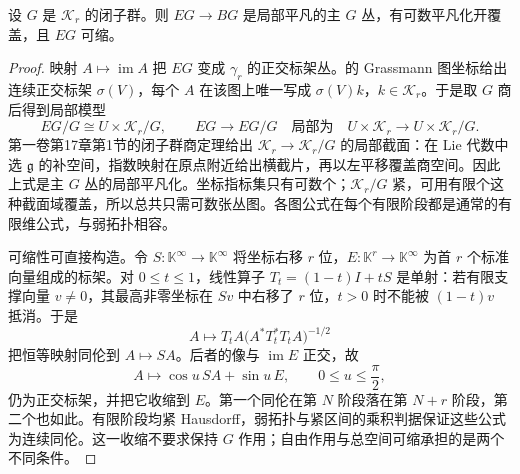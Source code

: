\begin{proposition}\label{g2:prop:universal-matrix-principal-bundle}
	设 \(G\) 是 \(\mathcal K_r\) 的闭子群。则 \(EG\to BG\) 是局部平凡的主 \(G\) 丛，有可数平凡化开覆盖，且 \(EG\) 可缩。
\end{proposition}
\begin{proof}
	映射 \(A\mapsto\operatorname{im}A\) 把 \(EG\) 变成 \(\gamma_r\) 的正交标架丛。的 Grassmann 图坐标给出连续正交标架 \(\sigma(V)\)，每个 \(A\) 在该图上唯一写成 \(\sigma(V)k\)，\(k\in \mathcal K_r\)。于是取 \(G\) 商后得到局部模型
	\[
		EG/G\cong U\times \mathcal K_r/G,\qquad
		EG\longrightarrow EG/G\quad\text{局部为}\quad
		U\times \mathcal K_r\longrightarrow U\times \mathcal K_r/G.
	\]
	第一卷第17章第1节的闭子群商定理给出 \(\mathcal K_r\to \mathcal K_r/G\) 的局部截面：在 Lie 代数中选 \(\mathfrak g\) 的补空间，指数映射在原点附近给出横截片，再以左平移覆盖商空间。因此上式是主 \(G\) 丛的局部平凡化。坐标指标集只有可数个；\(\mathcal K_r/G\) 紧，可用有限个这种截面域覆盖，所以总共只需可数张丛图。各图公式在每个有限阶段都是通常的有限维公式，与弱拓扑相容。

	可缩性可直接构造。令 \(S:\mathbb K^\infty\to \mathbb K^\infty\) 将坐标右移 \(r\) 位，\(E:\mathbb K^r\to \mathbb K^\infty\) 为首 \(r\) 个标准向量组成的标架。对 \(0\le t\le1\)，线性算子 \(T_t=(1-t)I+tS\) 是单射：若有限支撑向量 \(v\ne0\)，其最高非零坐标在 \(Sv\) 中右移了 \(r\) 位，\(t>0\) 时不能被 \((1-t)v\) 抵消。于是
	\[
		A\longmapsto T_tA\bigl(A^*T_t^*T_tA\bigr)^{-1/2}
	\]
	把恒等映射同伦到 \(A\mapsto SA\)。后者的像与 \(\operatorname{im}E\) 正交，故
	\[
		A\longmapsto\cos u\,SA+\sin u\,E,
		\qquad 0\le u\le\frac\pi2,
	\]
	仍为正交标架，并把它收缩到 \(E\)。第一个同伦在第 \(N\) 阶段落在第 \(N+r\) 阶段，第二个也如此。有限阶段均紧 Hausdorff，弱拓扑与紧区间的乘积判据保证这些公式为连续同伦。这一收缩不要求保持 \(G\) 作用；自由作用与总空间可缩承担的是两个不同条件。
\end{proof}

